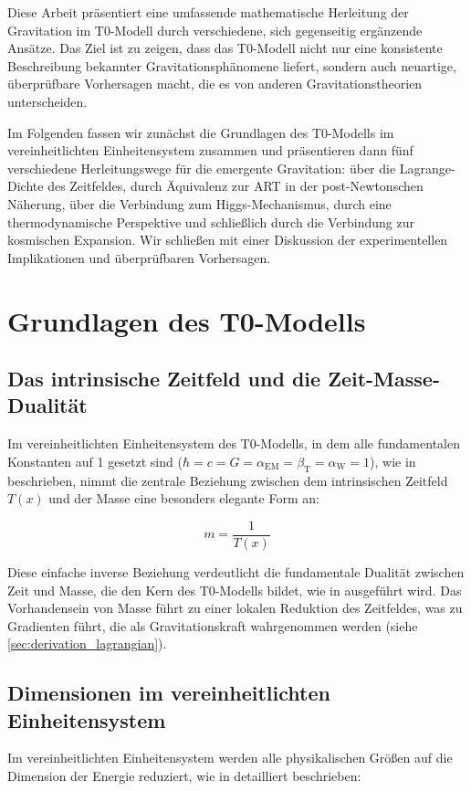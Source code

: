 \documentclass[12pt,a4paper]{article}
\newcommand{\Tfield}{T(x)}
\newcommand{\betaT}{\beta_{\text{T}}}
\newcommand{\alphaEM}{\alpha_{\text{EM}}}
\newcommand{\alphaW}{\alpha_{\text{W}}}
\begin{document}
	Diese Arbeit präsentiert eine umfassende mathematische Herleitung der Gravitation im T0-Modell durch verschiedene, sich gegenseitig ergänzende Ansätze. Das Ziel ist zu zeigen, dass das T0-Modell nicht nur eine konsistente Beschreibung bekannter Gravitationsphänomene liefert, sondern auch neuartige, überprüfbare Vorhersagen macht, die es von anderen Gravitationstheorien unterscheiden.
	
	Im Folgenden fassen wir zunächst die Grundlagen des T0-Modells im vereinheitlichten Einheitensystem zusammen und präsentieren dann fünf verschiedene Herleitungswege für die emergente Gravitation: über die Lagrange-Dichte des Zeitfeldes, durch Äquivalenz zur ART in der post-Newtonschen Näherung, über die Verbindung zum Higgs-Mechanismus, durch eine thermodynamische Perspektive und schließlich durch die Verbindung zur kosmischen Expansion. Wir schließen mit einer Diskussion der experimentellen Implikationen und überprüfbaren Vorhersagen.
	
	\section{Grundlagen des T0-Modells}
	\label{sec:foundations}
	
	\subsection{Das intrinsische Zeitfeld und die Zeit-Masse-Dualität}
	\label{subsec:intrinsic_time}
	Im vereinheitlichten Einheitensystem des T0-Modells, in dem alle fundamentalen Konstanten auf 1 gesetzt sind (\(\hbar = c = G = \alphaEM = \betaT = \alphaW = 1\)), wie in \cite{pascher_alpha_2025,pascher_alphabeta_2025} beschrieben, nimmt die zentrale Beziehung zwischen dem intrinsischen Zeitfeld \(\Tfield\) und der Masse eine besonders elegante Form an:
	
	\begin{equation}
		\label{eq:mass_time_relation}
		m = \frac{1}{\Tfield}
	\end{equation}
	
	Diese einfache inverse Beziehung verdeutlicht die fundamentale Dualität zwischen Zeit und Masse, die den Kern des T0-Modells bildet, wie in \cite{pascher_lagrange_2025} ausgeführt wird. Das Vorhandensein von Masse führt zu einer lokalen Reduktion des Zeitfeldes, was zu Gradienten führt, die als Gravitationskraft wahrgenommen werden (siehe \cref{sec:derivation_lagrangian}).
	
	\subsection{Dimensionen im vereinheitlichten Einheitensystem}
	\label{subsec:dimensions}
	Im vereinheitlichten Einheitensystem werden alle physikalischen Größen auf die Dimension der Energie reduziert, wie in \cite{pascher_alphabeta_2025} detailliert beschrieben:
	
\end{document}
